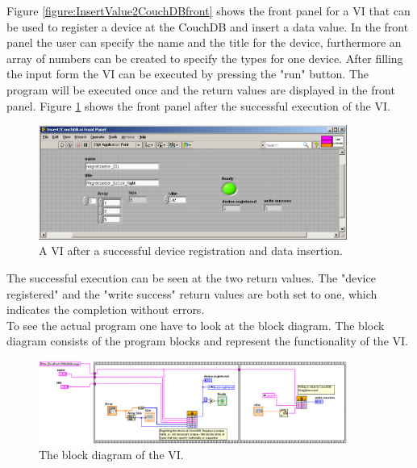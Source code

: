Figure \ref{figure:InsertValue2CouchDBfront} shows the front panel for a VI that can be used to register a device at the CouchDB and insert a data value. In the front panel the user can specify the name and the title for the device, furthermore an array of numbers can be created to specify the types for one device. After filling the input form the VI can be executed by pressing the "run" button. The program will be executed once and the return values are displayed in the front panel. Figure \ref{figure:InsertValue2CouchDBfrontDone} shows the front panel after the successful execution of the VI. 

\begin{figure}[h!]
  \centering
      \includegraphics[width=0.9\textwidth]{images/InsertValue2CouchDBfront_done2.png}
  \caption{A VI after a successful device registration and data insertion.}
  \label{figure:InsertValue2CouchDBfrontDone}
\end{figure}

The successful execution can be seen at the two return values. The "device registered" and the "write success" return values are both set to one, which indicates the completion without errors.\\

To see the actual program one have to look at the block diagram. The block diagram consists of the program blocks and represent the functionality of the VI. 

\begin{figure}[h!]
  \centering
      \includegraphics[width=0.9\textwidth]{images/InsertValue2CouchDB.png}
  \caption{The block diagram of the VI.}
  \label{figure:InsertValue2CouchDB}
\end{figure}

